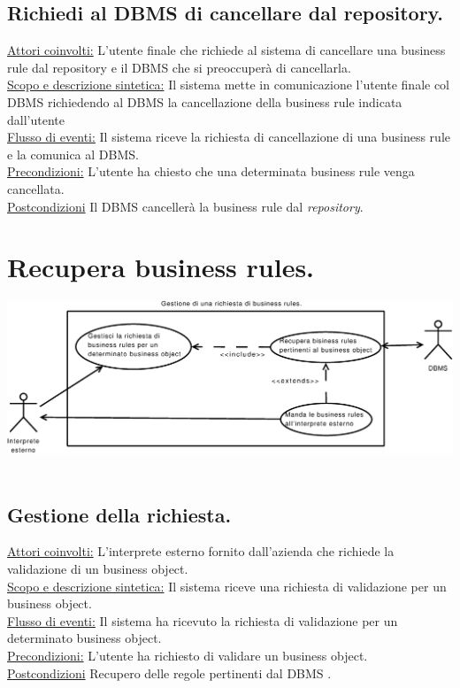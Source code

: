 \documentclass[11pt,titlepage,a4paper]{report}
\begin{document}
\subsection{Richiedi al DBMS di cancellare dal repository.}
\underline{Attori coinvolti:} L'utente finale che richiede al sistema di cancellare una business rule dal repository e il DBMS che si preoccuper\`a di cancellarla.\\
\underline{Scopo e descrizione sintetica:} Il sistema mette in comunicazione l'utente finale col DBMS richiedendo al DBMS la cancellazione della business rule indicata dall'utente\\
\underline{Flusso di eventi:} Il sistema riceve la richiesta di cancellazione di una business rule e la comunica al DBMS.\\
\underline{Precondizioni:} L'utente ha chiesto che una determinata business rule venga cancellata.\\
\underline{Postcondizioni} Il DBMS canceller\`a la business rule dal \textit{repository}.


\section{Recupera business rules.}
\begin{center}
 \includegraphics[width=1\textwidth]{Recupera-regole.eps}\
\end{center}

\subsection{Gestione della richiesta.}
\underline{Attori coinvolti:} L'interprete esterno fornito dall'azienda che richiede la validazione di un business object.\\
\underline{Scopo e descrizione sintetica:} Il sistema riceve una richiesta di validazione per un business object.\\
\underline{Flusso di eventi:} Il sistema ha ricevuto la richiesta di validazione per un determinato business object.\\
\underline{Precondizioni:} L'utente ha richiesto di validare un business object.\\
\underline{Postcondizioni} Recupero delle regole pertinenti dal DBMS .
\end{document}
